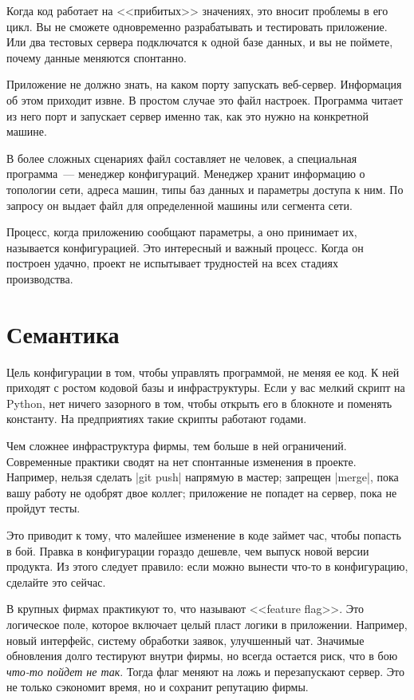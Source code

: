 Когда код работает на <<прибитых>> значениях, это вносит проблемы в его цикл. Вы
не сможете одновременно разрабатывать и тестировать приложение. Или два тестовых
сервера подключатся к одной базе данных, и вы не поймете, почему данные меняются
спонтанно.

Приложение не должно знать, на каком порту запускать веб-сервер. Информация об
этом приходит извне. В простом случае это файл настроек. Программа читает из
него порт и запускает сервер именно так, как это нужно на конкретной машине.

В более сложных сценариях файл составляет не человек, а специальная
программа~--- менеджер конфигураций. Менеджер хранит информацию о топологии
сети, адреса машин, типы баз данных и параметры доступа к ним. По запросу он
выдает файл для определенной машины или сегмента сети.

Процесс, когда приложению сообщают параметры, а оно принимает их, называется
конфигурацией. Это интересный и важный процесс. Когда он построен удачно, проект
не испытывает трудностей на всех стадиях производства.

\section{Семантика}

Цель конфигурации в том, чтобы управлять программой, не меняя ее код. К ней
приходят с ростом кодовой базы и инфраструктуры. Если у вас мелкий скрипт на
Python, нет ничего зазорного в том, чтобы открыть его в блокноте и поменять
константу. На предприятиях такие скрипты работают годами.

Чем сложнее инфраструктура фирмы, тем больше в ней ограничений. Современные
практики сводят на нет спонтанные изменения в проекте. Например, нельзя сделать
\spverb|git push| напрямую в мастер; запрещен \spverb|merge|, пока вашу работу
не одобрят двое коллег; приложение не попадет на сервер, пока не пройдут тесты.

Это приводит к тому, что малейшее изменение в коде займет час, чтобы попасть в
бой. Правка в конфигурации гораздо дешевле, чем выпуск новой версии продукта. Из
этого следует правило: если можно вынести что-то в конфигурацию, сделайте это
сейчас.

\label{feature-flags}

В крупных фирмах практикуют то, что называют <<feature flag>>. Это логическое
поле, которое включает целый пласт логики в приложении. Например, новый
интерфейс, систему обработки заявок, улучшенный чат. Значимые обновления долго
тестируют внутри фирмы, но всегда остается риск, что в бою \emph{что-то пойдет
не так}. Тогда флаг меняют на ложь и перезапускают сервер. Это не только
сэкономит время, но и сохранит репутацию фирмы.

